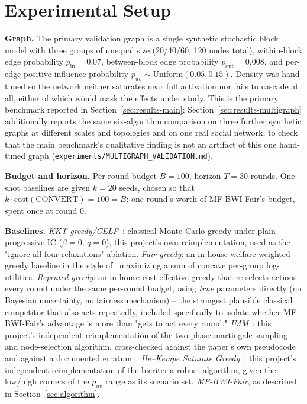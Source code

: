 \documentclass[journal]{IEEEtran}
\begin{document}
\section{Experimental Setup}
\label{sec:setup}

\textbf{Graph.} The primary validation graph is a single synthetic
stochastic block model with three groups of unequal size (20/40/60, 120
nodes total), within-block edge probability $p_{\mathrm{in}}=0.07$,
between-block edge probability $p_{\mathrm{out}}=0.008$, and per-edge
positive-influence probability $p_{uv}\sim\mathrm{Uniform}(0.05,0.15)$.
Density was hand-tuned so the network neither saturates near full
activation nor fails to cascade at all, either of which would mask the
effects under study. This is the primary benchmark reported in
Section~\ref{sec:results-main}; Section~\ref{sec:results-multigraph}
additionally reports the same six-algorithm comparison on three further
synthetic graphs at different scales and topologies and on one real
social network, to check that the main benchmark's qualitative finding is
not an artifact of this one hand-tuned graph
(\texttt{experiments/MULTIGRAPH\_VALIDATION.md}).

\textbf{Budget and horizon.} Per-round budget $B=100$, horizon $T=30$
rounds. One-shot baselines are given $k=20$ seeds, chosen so that
$k\cdot\mathrm{cost}(\mathrm{CONVERT})=100=B$: one round's worth of
MF-BWI-Fair's budget, spent once at round 0.

\textbf{Baselines.} \emph{KKT-greedy/CELF}~\cite{kempe2003maximizing,leskovec2007cost}:
classical Monte Carlo greedy under plain progressive IC ($\beta=0$, $q=0$),
this project's own reimplementation, used as the "ignore all four
relaxations" ablation. \emph{Fair-greedy}: an in-house welfare-weighted
greedy baseline in the style of~\cite{rahmattalabi2021fair} maximizing a
sum of concave per-group log-utilities. \emph{Repeated-greedy}: an in-house
cost-effective greedy that re-selects actions every round under the same
per-round budget, using \emph{true} parameters directly (no Bayesian
uncertainty, no fairness mechanism) -- the strongest plausible classical
competitor that also acts repeatedly, included specifically to isolate
whether MF-BWI-Fair's advantage is more than "gets to act every round."
\emph{IMM}~\cite{tang2015influence}: this project's independent
reimplementation of the two-phase martingale sampling and node-selection
algorithm, cross-checked against the paper's own pseudocode and against a
documented erratum~\cite{chen2018issue}. \emph{He--Kempe Saturate
Greedy}~\cite{he2016robust}: this project's independent reimplementation of
the bicriteria robust algorithm, given the low/high corners of the
$p_{uv}$ range as its scenario set. \emph{MF-BWI-Fair}, as described in
Section~\ref{sec:algorithm}.
\end{document}
